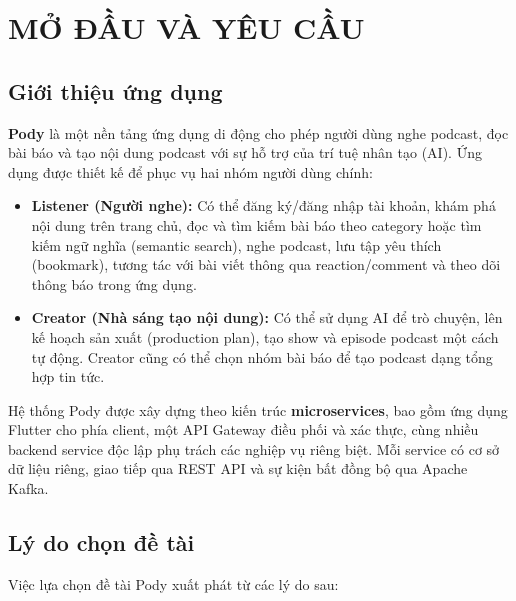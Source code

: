 \documentclass[14pt,a4paper,oneside]{extreport}
\begin{document}
\chapter{MỞ ĐẦU VÀ YÊU CẦU}
\label{chap:mo-dau}

\section{Giới thiệu ứng dụng}
\label{sec:gioi-thieu}

\textbf{Pody} là một nền tảng ứng dụng di động cho phép người dùng nghe podcast, đọc bài báo và tạo nội dung podcast với sự hỗ trợ của trí tuệ nhân tạo (AI). Ứng dụng được thiết kế để phục vụ hai nhóm người dùng chính:

\begin{itemize}[leftmargin=2cm]
  \item \textbf{Listener (Người nghe):} Có thể đăng ký/đăng nhập tài khoản, khám phá nội dung trên trang chủ, đọc và tìm kiếm bài báo theo category hoặc tìm kiếm ngữ nghĩa (semantic search), nghe podcast, lưu tập yêu thích (bookmark), tương tác với bài viết thông qua reaction/comment và theo dõi thông báo trong ứng dụng.

  \item \textbf{Creator (Nhà sáng tạo nội dung):} Có thể sử dụng AI để trò chuyện, lên kế hoạch sản xuất (production plan), tạo show và episode podcast một cách tự động. Creator cũng có thể chọn nhóm bài báo để tạo podcast dạng tổng hợp tin tức.
\end{itemize}

Hệ thống Pody được xây dựng theo kiến trúc \textbf{microservices}, bao gồm ứng dụng Flutter cho phía client, một API Gateway điều phối và xác thực, cùng nhiều backend service độc lập phụ trách các nghiệp vụ riêng biệt. Mỗi service có cơ sở dữ liệu riêng, giao tiếp qua REST API và sự kiện bất đồng bộ qua Apache Kafka.

\section{Lý do chọn đề tài}
\label{sec:ly-do}

Việc lựa chọn đề tài Pody xuất phát từ các lý do sau:
\end{document}
